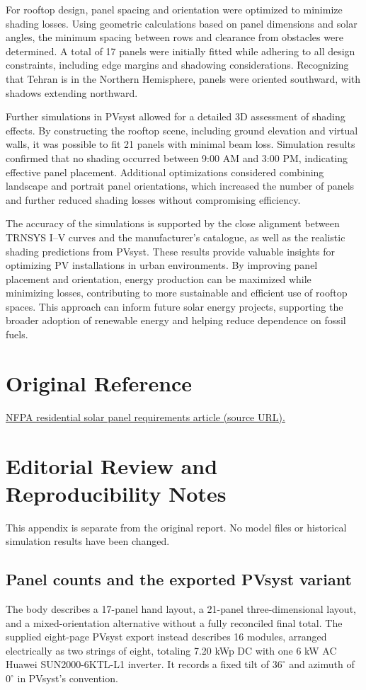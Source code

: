 \documentclass[11pt,a4paper]{article}
\begin{document}
For rooftop design, panel spacing and orientation were optimized to minimize shading losses. Using geometric calculations based on panel dimensions and solar angles, the minimum spacing between rows and clearance from obstacles were determined. A total of 17 panels were initially fitted while adhering to all design constraints, including edge margins and shadowing considerations. Recognizing that Tehran is in the Northern Hemisphere, panels were oriented southward, with shadows extending northward.

Further simulations in PVsyst allowed for a detailed 3D assessment of shading effects. By constructing the rooftop scene, including ground elevation and virtual walls, it was possible to fit 21 panels with minimal beam loss. Simulation results confirmed that no shading occurred between 9:00 AM and 3:00 PM, indicating effective panel placement. Additional optimizations considered combining landscape and portrait panel orientations, which increased the number of panels and further reduced shading losses without compromising efficiency.

The accuracy of the simulations is supported by the close alignment between TRNSYS I--V curves and the manufacturer’s catalogue, as well as the realistic shading predictions from PVsyst. These results provide valuable insights for optimizing PV installations in urban environments. By improving panel placement and orientation, energy production can be maximized while minimizing losses, contributing to more sustainable and efficient use of rooftop spaces. This approach can inform future solar energy projects, supporting the broader adoption of renewable energy and helping reduce dependence on fossil fuels.

\FloatBarrier
\section{Original Reference}

\href{https://www.nfpa.org/news-blogs-and-articles/blogs/2024/02/29/residential-solar-panel-requirements}{NFPA residential solar panel requirements article (source URL).}

\FloatBarrier\clearpage\appendix\section{Editorial Review and Reproducibility Notes}
This appendix is separate from the original report. No model files or historical simulation results have been changed.
\subsection{Panel counts and the exported PVsyst variant}
The body describes a 17-panel hand layout, a 21-panel three-dimensional layout, and a mixed-orientation alternative without a fully reconciled final total. The supplied eight-page PVsyst export instead describes 16 modules, arranged electrically as two strings of eight, totaling 7.20 kWp DC with one 6 kW AC Huawei SUN2000-6KTL-L1 inverter. It records a fixed tilt of $36^\circ$ and azimuth of $0^\circ$ in PVsyst's convention.
\end{document}
